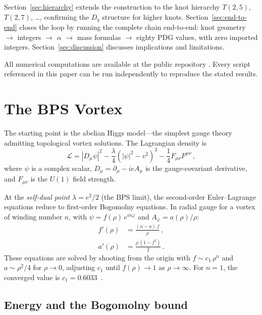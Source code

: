 \documentclass[11pt]{article}
\begin{document}
Section~\ref{sec:hierarchy} extends the construction to the knot
hierarchy $T(2,5)$, $T(2,7)$, \ldots, confirming the $D_q$
structure for higher knots.
Section~\ref{sec:end-to-end} closes the loop by running the
complete chain end-to-end: knot geometry $\to$ integers $\to$
$\alpha$ $\to$ mass formulas $\to$ eighty PDG values, with zero
imported integers.  Section~\ref{sec:discussion} discusses
implications and limitations.

All numerical computations are available at the public repository
\cite{public-repo}.  Every script referenced in this paper can be
run independently to reproduce the stated results.


\section{The BPS Vortex}
\label{sec:bps}

The starting point is the abelian Higgs model---the simplest
gauge theory admitting topological vortex solutions.  The
Lagrangian density is
\begin{equation}
\label{eq:ah-lagrangian}
  \mathcal{L} = |D_\mu \psi|^2
  - \frac{\lambda}{4}(|\psi|^2 - v^2)^2
  - \frac{1}{4}F_{\mu\nu}F^{\mu\nu}\,,
\end{equation}
where $\psi$ is a complex scalar, $D_\mu = \partial_\mu - ieA_\mu$
is the gauge-covariant derivative, and $F_{\mu\nu}$ is the $U(1)$
field strength.

At the \emph{self-dual point} $\lambda = e^2/2$ (the BPS limit),
the second-order Euler--Lagrange equations reduce to first-order
Bogomolny equations.  In radial gauge for a vortex of winding
number $n$, with $\psi = f(\rho)\,e^{in\varphi}$ and
$A_\varphi = a(\rho)/\rho$:
\begin{align}
  f'(\rho) &= \frac{(n-a)\,f}{\rho}\,,\label{eq:bps-f}\\[4pt]
  a'(\rho) &= \frac{\rho\,(1-f^2)}{2}\,.\label{eq:bps-a}
\end{align}
These equations are solved by shooting from the origin with
$f \sim c_1\,\rho^n$ and $a \sim \rho^2/4$ for
$\rho \to 0$, adjusting $c_1$ until $f(\rho) \to 1$ as
$\rho \to \infty$.  For $n = 1$, the converged value is
$c_1 = 0.6033$~\cite{deVega-Schaposnik}.

\subsection{Energy and the Bogomolny bound}
\end{document}
